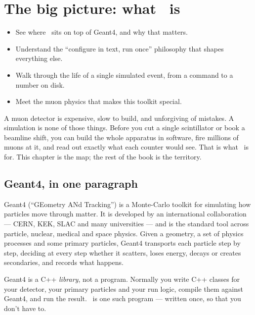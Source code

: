 \chapter{The big picture: what \musrSim\ is}
\label{ch:big}

\begin{willdo}
\begin{itemize}
  \item See where \musrSim\ sits on top of Geant4, and why that matters.
  \item Understand the ``configure in text, run once'' philosophy that shapes everything else.
  \item Walk through the life of a single simulated event, from a command to a number on disk.
  \item Meet the muon physics that makes this toolkit special.
\end{itemize}
\end{willdo}

A muon detector is expensive, slow to build, and unforgiving of mistakes. A simulation is none of those things. Before you cut a single scintillator or book a beamline shift, you can build the whole apparatus in software, fire millions of muons at it, and read out exactly what each counter would see. That is what \musrSim\ is for. This chapter is the map; the rest of the book is the territory.

\section{Geant4, in one paragraph}
Geant4 (``GEometry ANd Tracking'') is a Monte-Carlo toolkit for simulating how particles move through matter. It is developed by an international collaboration --- CERN, KEK, SLAC and many universities --- and is the standard tool across particle, nuclear, medical and space physics. Given a geometry, a set of physics processes and some primary particles, Geant4 transports each particle step by step, deciding at every step whether it scatters, loses energy, decays or creates secondaries, and records what happens.

\begin{hood}
Geant4 is a C++ \emph{library}, not a program. Normally you write C++ classes for your detector, your primary particles and your run logic, compile them against Geant4, and run the result. \musrSim\ is one such program --- written once, so that you don't have to.
\end{hood}

